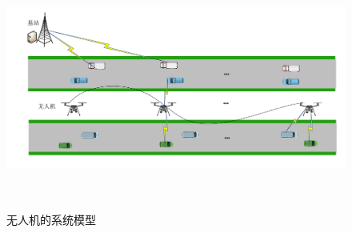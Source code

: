 \begin{figure}[H]
\centering
\includegraphics[width=12cm,height=8cm]{figures//chap4//第四章系统模型图.pdf}
\caption{无人机的系统模型}
\label{systemuav2}
\end{figure}

